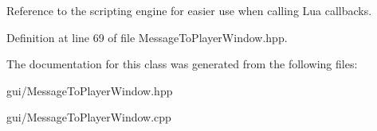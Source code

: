 Reference to the scripting engine for easier use when calling Lua callbacks. 



Definition at line 69 of file Message\+To\+Player\+Window.\+hpp.



The documentation for this class was generated from the following files\+:\begin{DoxyCompactItemize}
\item 
gui/Message\+To\+Player\+Window.\+hpp\item 
gui/Message\+To\+Player\+Window.\+cpp\end{DoxyCompactItemize}
